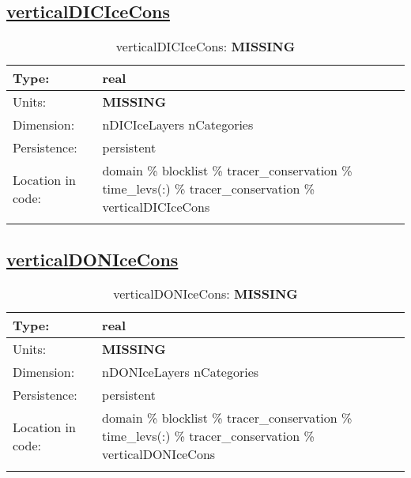 \subsection[verticalDICIceCons]{\hyperref[sec:var_tab_tracer_conservation]{verticalDICIceCons}}
\label{subsec:var_sec_tracer_conservation_verticalDICIceCons}
\begin{center}
\begin{longtable}{| p{2.0in} | p{4.0in} |}
        \hline 
        Type: & real \\
        \hline 
        Units: & {\bf \color{red} MISSING} \\
        \hline 
        Dimension: & nDICIceLayers nCategories \\
        \hline 
        Persistence: & persistent \\
        \hline 
         Location in code: & domain \% blocklist \% tracer\_conservation \% time\_levs(:) \% tracer\_conservation \% verticalDICIceCons \\
         \hline 
    \caption{verticalDICIceCons: {\bf \color{red} MISSING}}
\end{longtable}
\end{center}
\subsection[verticalDONIceCons]{\hyperref[sec:var_tab_tracer_conservation]{verticalDONIceCons}}
\label{subsec:var_sec_tracer_conservation_verticalDONIceCons}
\begin{center}
\begin{longtable}{| p{2.0in} | p{4.0in} |}
        \hline 
        Type: & real \\
        \hline 
        Units: & {\bf \color{red} MISSING} \\
        \hline 
        Dimension: & nDONIceLayers nCategories \\
        \hline 
        Persistence: & persistent \\
        \hline 
         Location in code: & domain \% blocklist \% tracer\_conservation \% time\_levs(:) \% tracer\_conservation \% verticalDONIceCons \\
         \hline 
    \caption{verticalDONIceCons: {\bf \color{red} MISSING}}
\end{longtable}
\end{center}
